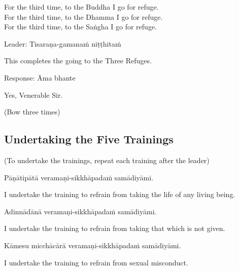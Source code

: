 \begin{english-verses}
  For the third time, to the Buddha I go for refuge.\\
  For the third time, to the Dhamma I go for refuge.\\
  For the third time, to the Saṅgha I go for refuge.
\end{english-verses}

Leader: Tisaraṇa-gamanaṁ niṭṭhitaṁ

\begin{english}
  This completes the going to the Three Refuges.
\end{english}

Response: Āma bhante

\begin{english}
  Yes, Venerable Sir.
\end{english}

\begin{center}
  (Bow three times)
\end{center}

\subsection{Undertaking the Five Trainings}

\begin{center}
  (To undertake the trainings, repeat each training after the leader)
\end{center}

Pāṇātipātā veramaṇi-sikkhāpadaṁ samādiyāmi.

\begin{english-hang}
  I undertake the training\hyperlink{endnote136-appendix}{\hypertarget{endnote136-body}{}}
  to refrain from taking the life of any living being.
\end{english-hang}

Adinnādānā veramaṇi-sikkhāpadaṁ samādiyāmi.

\begin{english}
  I undertake the training to refrain from taking that which is not given.
\end{english}

Kāmesu micchācārā veramaṇi-sikkhāpadaṁ samādiyāmi.

\begin{english}
  I undertake the training to refrain from sexual misconduct.
\end{english}

